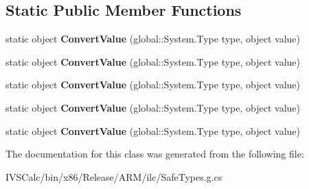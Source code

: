 \subsection*{Static Public Member Functions}
\begin{DoxyCompactItemize}
\item 
\mbox{\label{class_windows_1_1_u_i_1_1_xaml_1_1_markup_1_1_xaml_binding_helper_ae31690e431545014771ffd00f9f4141c}} 
static object {\bfseries Convert\+Value} (global\+::\+System.\+Type type, object value)
\item 
\mbox{\label{class_windows_1_1_u_i_1_1_xaml_1_1_markup_1_1_xaml_binding_helper_ae31690e431545014771ffd00f9f4141c}} 
static object {\bfseries Convert\+Value} (global\+::\+System.\+Type type, object value)
\item 
\mbox{\label{class_windows_1_1_u_i_1_1_xaml_1_1_markup_1_1_xaml_binding_helper_ae31690e431545014771ffd00f9f4141c}} 
static object {\bfseries Convert\+Value} (global\+::\+System.\+Type type, object value)
\item 
\mbox{\label{class_windows_1_1_u_i_1_1_xaml_1_1_markup_1_1_xaml_binding_helper_ae31690e431545014771ffd00f9f4141c}} 
static object {\bfseries Convert\+Value} (global\+::\+System.\+Type type, object value)
\item 
\mbox{\label{class_windows_1_1_u_i_1_1_xaml_1_1_markup_1_1_xaml_binding_helper_ae31690e431545014771ffd00f9f4141c}} 
static object {\bfseries Convert\+Value} (global\+::\+System.\+Type type, object value)
\end{DoxyCompactItemize}


The documentation for this class was generated from the following file\+:\begin{DoxyCompactItemize}
\item 
I\+V\+S\+Calc/bin/x86/\+Release/\+A\+R\+M/ilc/Safe\+Types.\+g.\+cs\end{DoxyCompactItemize}
